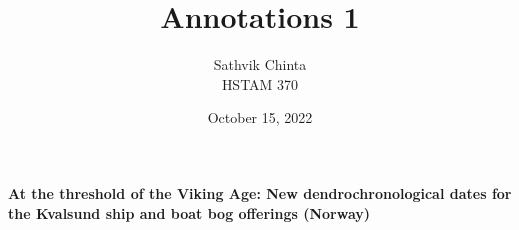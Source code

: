 \documentclass[a4paper]{article}
\title {
	Annotations 1
}
\author {
	\normalsize Sathvik Chinta\\\normalsize
    \normalsize HSTAM 370\\\normalsize
}
\date {
	\color{black} October 15, 2022
}
\begin{document}
 \maketitle
    \section{}
        \textbf{At the threshold of the Viking Age: New dendrochronological dates for the Kvalsund ship and boat bog offerings (Norway)}

        
        
        \pagebreak
        
        
        \cite{NORDEIDE2020102192}
\end{document}
